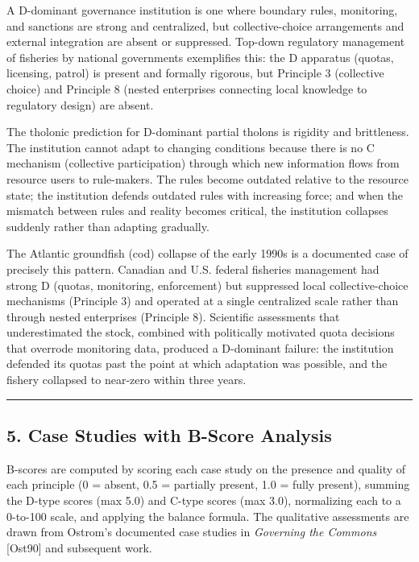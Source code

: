 \documentclass[
  11pt,
  letterpaper,
]{article}
\begin{document}
A D-dominant governance institution is one where boundary rules,
monitoring, and sanctions are strong and centralized, but
collective-choice arrangements and external integration are absent or
suppressed. Top-down regulatory management of fisheries by national
governments exemplifies this: the D apparatus (quotas, licensing,
patrol) is present and formally rigorous, but Principle 3 (collective
choice) and Principle 8 (nested enterprises connecting local knowledge
to regulatory design) are absent.

The tholonic prediction for D-dominant partial tholons is rigidity and
brittleness. The institution cannot adapt to changing conditions because
there is no C mechanism (collective participation) through which new
information flows from resource users to rule-makers. The rules become
outdated relative to the resource state; the institution defends
outdated rules with increasing force; and when the mismatch between
rules and reality becomes critical, the institution collapses suddenly
rather than adapting gradually.

The Atlantic groundfish (cod) collapse of the early 1990s is a
documented case of precisely this pattern. Canadian and U.S. federal
fisheries management had strong D (quotas, monitoring, enforcement) but
suppressed local collective-choice mechanisms (Principle 3) and operated
at a single centralized scale rather than through nested enterprises
(Principle 8). Scientific assessments that underestimated the stock,
combined with politically motivated quota decisions that overrode
monitoring data, produced a D-dominant failure: the institution defended
its quotas past the point at which adaptation was possible, and the
fishery collapsed to near-zero within three years.

\begin{center}\rule{0.5\linewidth}{0.5pt}\end{center}

\subsection{5. Case Studies with B-Score
Analysis}\label{case-studies-with-b-score-analysis}

B-scores are computed by scoring each case study on the presence and
quality of each principle (0 = absent, 0.5 = partially present, 1.0 =
fully present), summing the D-type scores (max 5.0) and C-type scores
(max 3.0), normalizing each to a 0-to-100 scale, and applying the
balance formula. The qualitative assessments are drawn from Ostrom's
documented case studies in \emph{Governing the Commons} {[}Ost90{]} and
subsequent work.
\end{document}
